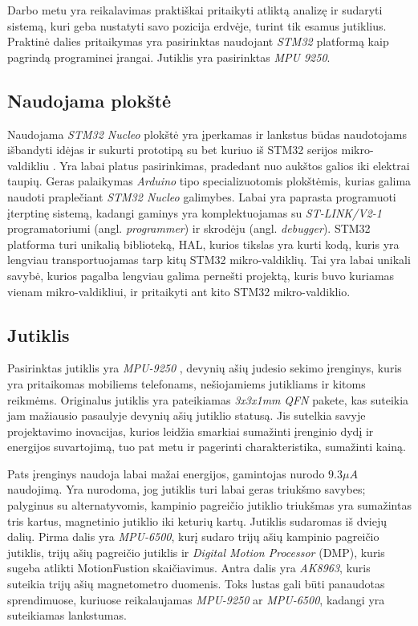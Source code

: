 Darbo metu yra reikalavimas praktiškai pritaikyti atliktą analizę ir sudaryti sistemą, kuri geba nustatyti savo pozicija erdvėje, turint tik esamus jutiklius.
Praktinė dalies pritaikymas yra pasirinktas naudojant \textit{STM32} platformą kaip pagrindą programinei įrangai.
Jutiklis yra pasirinktas \textit{MPU 9250}.

\subsection{Naudojama plokštė} \label{hardware}

Naudojama \textit{STM32 Nucleo} plokštė yra įperkamas ir lankstus būdas naudotojams išbandyti idėjas ir sukurti prototipą su bet kuriuo iš STM32 serijos mikro-valdikliu \cite{STM3258:online}.
Yra labai platus pasirinkimas, pradedant nuo aukštos galios iki elektrai taupių.
Geras palaikymas \textit{Arduino} tipo specializuotomis plokštėmis, kurias galima naudoti praplečiant \textit{STM32 Nucleo} galimybes.
Labai yra paprasta programuoti įterptinę sistemą, kadangi gaminys yra komplektuojamas su \textit{ST-LINK/V2-1} programatoriumi (angl. \textit{programmer}) ir skrodėju (angl. \textit{debugger}).
STM32 platforma turi unikalią biblioteką, HAL, kurios tikslas yra kurti kodą, kuris yra lengviau transportuojamas tarp kitų STM32 mikro-valdiklių.
Tai yra labai unikali savybė, kurios pagalba lengviau galima pernešti projektą, kuris buvo kuriamas vienam mikro-valdikliui, ir pritaikyti ant kito STM32 mikro-valdiklio.

\subsection{Jutiklis}

Pasirinktas jutiklis yra \textit{MPU-9250} \cite{MPU-96:online}, devynių ašių judesio sekimo įrenginys, kuris yra pritaikomas mobiliems telefonams, nešiojamiems jutikliams ir kitoms reikmėms.
Originalus  jutiklis yra pateikiamas \textit{3x3x1mm} \textit{QFN} pakete, kas suteikia jam mažiausio pasaulyje devynių ašių jutiklio statusą.
Jis sutelkia savyje projektavimo inovacijas, kurios leidžia smarkiai sumažinti įrenginio dydį ir energijos suvartojimą, tuo pat metu ir pagerinti charakteristika, sumažinti kainą.

Pats įrenginys naudoja labai mažai energijos, gamintojas nurodo $9.3\mu A$ naudojimą.
Yra nurodoma, jog jutiklis turi labai geras triukšmo savybes; palyginus su alternatyvomis, kampinio pagreičio jutiklio triukšmas yra sumažintas tris kartus, magnetinio jutiklio iki keturių kartų.
Jutiklis sudaromas iš dviejų dalių.
Pirma dalis yra \textit{MPU-6500}, kurį sudaro trijų ašių kampinio pagreičio jutiklis, trijų ašių pagreičio jutiklis ir \textit{Digital Motion Processor} (DMP), kuris sugeba atlikti MotionFustion skaičiavimus.
Antra dalis yra \textit{AK8963}, kuris suteikia trijų ašių magnetometro duomenis.
Toks lustas gali būti panaudotas sprendimuose, kuriuose reikalaujamas \textit{MPU-9250} ar \textit{MPU-6500}, kadangi yra suteikiamas lankstumas.

